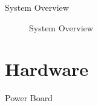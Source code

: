 \documentclass[apectratio=169]{beamer}
\begin{document}
\begin{frame}{System Overview}
\begin{figure}
			\caption{System Overview}
		\end{figure}
	\end{frame}
  
  \section{Hardware}
  	\begin{frame}{Power Board}
		\begin{figure}
			\centering




\end{figure}
\end{frame}
\end{document}
